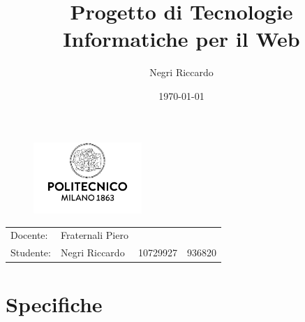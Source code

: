 \documentclass{article}
\title{\vspace{-2cm}Progetto di Tecnologie Informatiche per il Web} %
\author{Negri Riccardo} %
\date{\today}
\begin{document}
\maketitle

\begin{figure}[H]
\centering
\includegraphics[width=0.365\textwidth]{assets/logo.jpg}
\end{figure}

\begin{center}
\begin{tabular}{l l l l}
Docente: & Fraternali Piero& & \\ 
Studente: & Negri Riccardo & 10729927 & 936820 
\end{tabular}
\end{center}

\tableofcontents
\pagebreak

\section{Specifiche}
\end{document}
